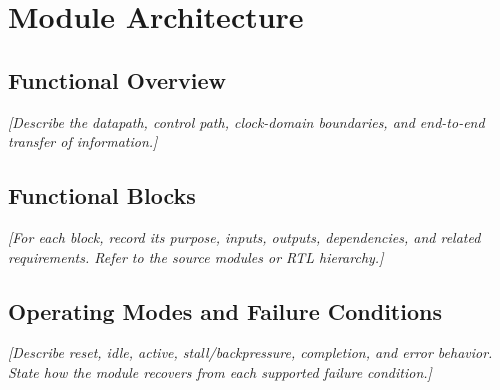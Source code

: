 \chapter{Module Architecture}

\section{Functional Overview}
\textit{[Describe the datapath, control path, clock-domain boundaries, and end-to-end transfer of information.]}


\section{Functional Blocks}
\textit{[For each block, record its purpose, inputs, outputs, dependencies, and related requirements. Refer to the source modules or RTL hierarchy.]}

\section{Operating Modes and Failure Conditions}
\textit{[Describe reset, idle, active, stall/backpressure, completion, and error behavior. State how the module recovers from each supported failure condition.]}
